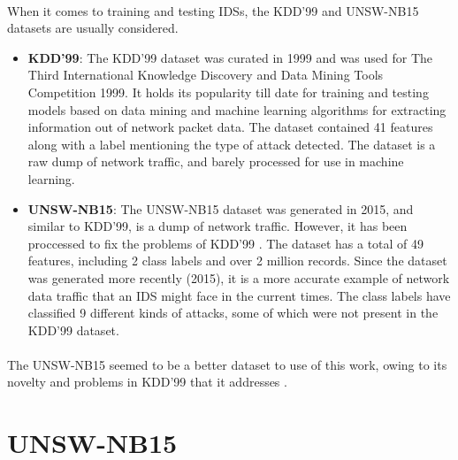 \paragraph{}
When it comes to training and testing IDSs, the KDD'99 \cite{kdd99} and UNSW-NB15 \cite{unsw15} datasets are usually considered.
\begin{itemize}
    \item \textbf{KDD'99}: The KDD'99 dataset was curated in 1999 and was used for The Third International Knowledge Discovery and Data Mining Tools Competition 1999. It holds its popularity till date for training and testing models based on data mining and machine learning algorithms for extracting information out of network packet data. The dataset contained 41 features along with a label mentioning the type of attack detected. The dataset is a raw dump of network traffic, and barely processed for use in machine learning.
    \item \textbf{UNSW-NB15}: The UNSW-NB15 dataset was generated in 2015, and similar to KDD'99, is a dump of network traffic. However, it has been proccessed to fix the problems of KDD'99 \cite{unsw_comparison}. The dataset has a total of 49 features, including 2 class labels and over 2 million records. Since the dataset was generated more recently (2015), it is a more accurate example of network data traffic that an IDS might face in the current times. The class labels have classified 9 different kinds of attacks, some of which were not present in the KDD'99 dataset.
\end{itemize}

\paragraph{}
The UNSW-NB15 seemed to be a better dataset to use of this work, owing to its novelty and problems in KDD'99 that it addresses \cite{unsw_comparison}.

\section{UNSW-NB15}

